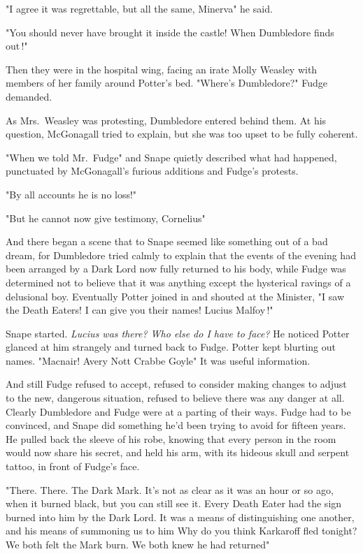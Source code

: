 "I agree it was regrettable, but all the same, Minerva{\el}" he said.

"You should never have brought it inside the castle! When Dumbledore finds out{\el}\,!"

Then they were in the hospital wing, facing an irate Molly Weasley with members of her family around Potter's bed. "Where's Dumbledore?" Fudge demanded.

As Mrs.~Weasley was protesting, Dumbledore entered behind them. At his question, McGonagall tried to explain, but she was too upset to be fully coherent.

"When we told Mr.~Fudge{\el}" and Snape quietly described what had happened, punctuated by McGonagall's furious additions and Fudge's protests.

"By all accounts he is no loss!"

"But he cannot now give testimony, Cornelius{\el}"

And there began a scene that to Snape seemed like something out of a bad dream, for Dumbledore tried calmly to explain that the events of the evening had been arranged by a Dark Lord now fully returned to his body, while Fudge was determined not to believe that it was anything except the hysterical ravings of a delusional boy. Eventually Potter joined in and shouted at the Minister, "I saw the Death Eaters! I can give you their names! Lucius Malfoy{\el}\,!"

Snape started. \emph{Lucius was there? Who else do I have to face?} He noticed Potter glanced at him strangely and turned back to Fudge. Potter kept blurting out names. "Macnair! Avery{\el} Nott{\el} Crabbe{\el} Goyle{\el}" It was useful information.

And still Fudge refused to accept, refused to consider making changes to adjust to the new, dangerous situation, refused to believe there was any danger at all. Clearly Dumbledore and Fudge were at a parting of their ways. Fudge had to be convinced, and Snape did something he'd been trying to avoid for fifteen years. He pulled back the sleeve of his robe, knowing that every person in the room would now share his secret, and held his arm, with its hideous skull and serpent tattoo, in front of Fudge's face.

"There. There. The Dark Mark. It's not as clear as it was an hour or so ago, when it burned black, but you can still see it. Every Death Eater had the sign burned into him by the Dark Lord. It was a means of distinguishing one another, and his means of summoning us to him{\el} Why do you think Karkaroff fled tonight? We both felt the Mark burn. We both knew he had returned{\el}"

